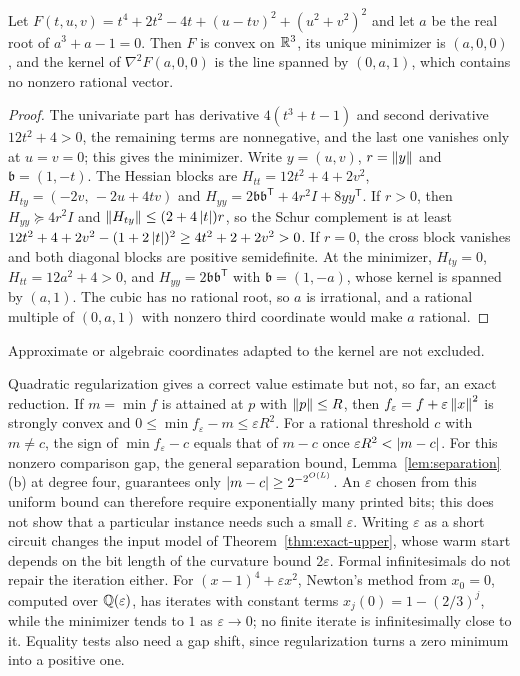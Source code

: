 \begin{proposition}
\label{prop:bnd-kernel}
Let $F(t,u,v)=t^4+2t^2-4t+(u-tv)^2+(u^2+v^2)^2$ and let $a$ be the real root
of $a^3+a-1=0$. Then $F$ is convex on $\mathbb R^3$, its unique minimizer is
$(a,0,0)$, and the kernel of $\nabla^2F(a,0,0)$ is the line spanned by
$(0,a,1)$, which contains no nonzero rational vector.
\end{proposition}

\begin{proof}
The univariate part has derivative $4(t^3+t-1)$ and second derivative
$12t^2+4>0$, the remaining terms are nonnegative, and the last one vanishes
only at $u=v=0$; this gives the minimizer. Write $y=(u,v)$, $r=\left\lVert y\right\rVert$ and
$\mathfrak b=(1,-t)$. The Hessian blocks are $H_{tt}=12t^2+4+2v^2$,
$H_{ty}=(-2v,\,-2u+4tv)$ and $H_{yy}=2\mathfrak b\mathfrak b^{\mathsf T}
+4r^2I+8yy^{\mathsf T}$. If $r>0$, then $H_{yy}\succeq4r^2I$ and
$\left\lVert H_{ty}\right\rVert\le(2+4\left\lvert t\right\rvert)r$, so the Schur complement is at least
$12t^2+4+2v^2-(1+2\left\lvert t\right\rvert)^2\ge4t^2+2+2v^2>0$. If $r=0$, the cross block
vanishes and both diagonal blocks are positive semidefinite. At the
minimizer, $H_{ty}=0$, $H_{tt}=12a^2+4>0$, and $H_{yy}=2\mathfrak b\mathfrak
b^{\mathsf T}$ with $\mathfrak b=(1,-a)$, whose kernel is spanned by $(a,1)$.
The cubic has no rational root, so $a$ is irrational, and a rational multiple
of $(0,a,1)$ with nonzero third coordinate would make $a$ rational.
\end{proof}

Approximate or algebraic coordinates adapted to the kernel are not excluded.

Quadratic regularization gives a correct value estimate but not, so far, an
exact reduction. If $m=\min f$ is attained at $p$ with $\left\lVert p\right\rVert\le R$, then
$f_\varepsilon=f+\varepsilon\left\lVert x\right\rVert^2$ is strongly convex and
$0\le\min f_\varepsilon-m\le\varepsilon R^2$. For a rational threshold $c$
with $m\ne c$, the sign of $\min f_\varepsilon-c$ equals that of $m-c$ once
$\varepsilon R^2<\left\lvert m-c\right\rvert$. For this nonzero comparison gap, the general
separation bound, Lemma~\ref{lem:separation}(b) at degree four, guarantees
only $\left\lvert m-c\right\rvert\ge2^{-2^{O(L)}}$. An $\varepsilon$ chosen from this uniform
bound can therefore require exponentially many printed bits; this does not
show that a particular instance needs such a small $\varepsilon$. Writing
$\varepsilon$ as a short circuit changes the input model of
Theorem~\ref{thm:exact-upper}, whose warm start depends on the bit length of
the curvature bound $2\varepsilon$. Formal infinitesimals do not repair the
iteration either. For $(x-1)^4+\varepsilon x^2$, Newton's method from $x_0=0$,
computed over $\mathbb Q(\varepsilon)$, has iterates with constant terms
$x_j(0)=1-(2/3)^j$, while the minimizer tends to $1$ as $\varepsilon\to0$; no
finite iterate is infinitesimally close to it. Equality tests also need a gap
shift, since regularization turns a zero minimum into a positive one.


